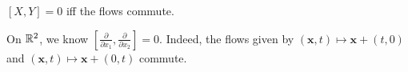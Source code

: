\begin{corollary}
    $[X, Y] = 0$ iff the flows commute.
\end{corollary}

\begin{eg}
    On $\mathbb{R}^2$, we know  $\left[\frac{\partial }{\partial x_1}, \frac{\partial }{\partial x_2} \right] = 0 $.
    Indeed, the flows given by $(\mathbf{x}, t) \mapsto \mathbf{x} + (t, 0)$ and  $(\mathbf{x}, t) \mapsto \mathbf{x} + (0, t)$ commute.
\end{eg}

